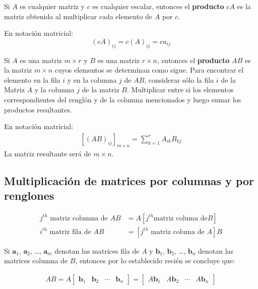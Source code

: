 \documentclass[a4paper,12pt]{article}
\begin{document}
\begin{concept}[i]
  Si $A$ es cualquier matriz y $c$ es cualquier escalar, entonces el
  \textbf{producto} $cA$ es la matriz obtenida al multiplicar cada elemento de
  $A$ por $c$.
\end{concept}
En notación matricial:
\begin{equation*}
  (cA)_{ij} = c(A)_{ij} = ca_{ij}
\end{equation*}

\begin{concept}
  Si $A$ es una matriz $m\times r$ y $B$ es una matriz $r\times n$, entonces
  el \textbf{producto} $AB$ es la matriz $m\times n$ cuyos elementos se
  determinan como sigue. Para encontrar el elemento en la fila $i$ y en la
  columna $j$ de $AB$, considerar sólo la fila $i$ de la Matriz $A$ y la
  columna $j$ de la matriz $B$. Multiplicar entre si los elementos
  correspondientes del renglón y de la columna mencionados y luego sumar los
  productos resultantes.
\end{concept}
En notación matricial:
\begin{align*}
  \left[ (AB)_{ij} \right]_{m\times n} = \sum_{k=1}^r A_{ik}B_{kj}
\end{align*}
La matriz resultante será de $m\times n$.

\subsection{Multiplicación de matrices por columnas y por renglones}

\begin{align*}
  j^{th} \textrm{ matriz columna de } AB &= A \left[ j^{th} \textrm{matriz columa de} B
  \right] \\
  i^{th}\textrm{ matriz fila de } AB &= \left[ j^{th} \textrm{ matriz columa de } A
  \right] B
\end{align*}

Si $\textbf{a}_1$, $\textbf{a}_2$, \ldots, $\textbf{a}_m$ denotan las matrices
fila de $A$ y $\textbf{b}_1$, $\textbf{b}_2$, \ldots, $\textbf{b}_n$ denotan
las matrices columna de $B$, entonces por lo establecido recién se concluye
que:

\begin{align*}
  AB =
  A\begin{bmatrix}\textbf{b}_1&\textbf{b}_2&\cdots&\textbf{b}_n \end{bmatrix}
    =
    \begin{bmatrix}A\textbf{b}_1&A\textbf{b}_2&\cdots&A\textbf{b}_n\end{bmatrix}
\end{align*}
\end{document}

